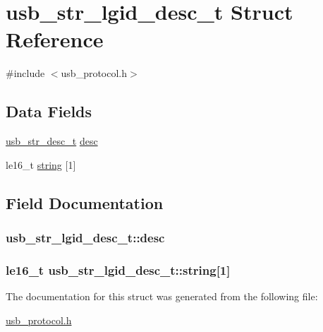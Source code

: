 \hypertarget{structusb__str__lgid__desc__t}{
\section{usb\-\_\-str\-\_\-lgid\-\_\-desc\-\_\-t \-Struct \-Reference}
\label{structusb__str__lgid__desc__t}
}


{\ttfamily \#include $<$usb\-\_\-protocol.\-h$>$}

\subsection*{\-Data \-Fields}
\begin{DoxyCompactItemize}
\item 
\hyperlink{structusb__str__desc__t}{usb\-\_\-str\-\_\-desc\-\_\-t} \hyperlink{structusb__str__lgid__desc__t_a9b1b4bea90e7ac4aac264d3a5b39a8d6}{desc}
\item 
le16\-\_\-t \hyperlink{structusb__str__lgid__desc__t_aeb9b6d37605e7a462e91ae345132f371}{string} \mbox{[}1\mbox{]}
\end{DoxyCompactItemize}


\subsection{\-Field \-Documentation}
\hypertarget{structusb__str__lgid__desc__t_a9b1b4bea90e7ac4aac264d3a5b39a8d6}{
\subsubsection[{desc}]{ {\bf usb\-\_\-str\-\_\-lgid\-\_\-desc\-\_\-t\-::desc}}}
\label{structusb__str__lgid__desc__t_a9b1b4bea90e7ac4aac264d3a5b39a8d6}
\hypertarget{structusb__str__lgid__desc__t_aeb9b6d37605e7a462e91ae345132f371}{
\subsubsection[{string}]{\setlength{\rightskip}{0pt plus 5cm}le16\-\_\-t {\bf usb\-\_\-str\-\_\-lgid\-\_\-desc\-\_\-t\-::string}\mbox{[}1\mbox{]}}}
\label{structusb__str__lgid__desc__t_aeb9b6d37605e7a462e91ae345132f371}


\-The documentation for this struct was generated from the following file\-:\begin{DoxyCompactItemize}
\item 
\hyperlink{usb__protocol_8h}{usb\-\_\-protocol.\-h}\end{DoxyCompactItemize}
